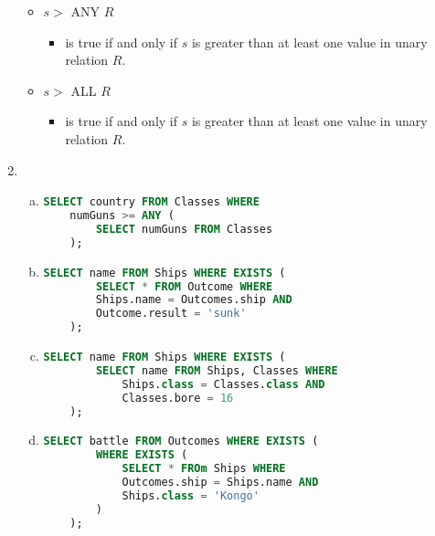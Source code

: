 \documentclass[12pt]{article}
\begin{document}
\begin{enumerate}[1.]
\begin{itemize}
        \item $s >$ ANY $R$
        \begin{itemize}
            \item is true if and only if $s$ is greater than at least one value in
            unary relation $R$.
        \end{itemize}

        \item $s >$ ALL $R$
        \begin{itemize}
            \item is true if and only if $s$ is greater than at least one value in unary
            relation $R$.
        \end{itemize}
    \end{itemize}

    \item

    \begin{enumerate}[a)]

        \item
    \begin{lstlisting}[language=SQL]
    SELECT country FROM Classes WHERE
    numGuns >= ANY (
        SELECT numGuns FROM Classes
    );
    \end{lstlisting}

        \item

    \begin{lstlisting}[language=SQL]
    SELECT name FROM Ships WHERE EXISTS (
        SELECT * FROM Outcome WHERE
        Ships.name = Outcomes.ship AND
        Outcome.result = 'sunk'
    );
    \end{lstlisting}

        \item

    \begin{lstlisting}[language=SQL]
    SELECT name FROM Ships WHERE EXISTS (
        SELECT name FROM Ships, Classes WHERE
            Ships.class = Classes.class AND
            Classes.bore = 16
    );
    \end{lstlisting}

        \item

    \begin{lstlisting}[language=SQL]
    SELECT battle FROM Outcomes WHERE EXISTS (
        WHERE EXISTS (
            SELECT * FROm Ships WHERE
            Outcomes.ship = Ships.name AND
            Ships.class = 'Kongo'
        )
    );
    \end{lstlisting}

    \end{enumerate}
\end{enumerate}
\end{document}
